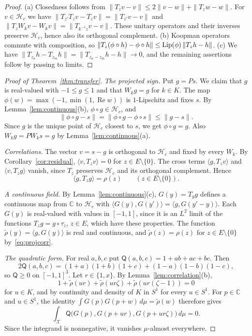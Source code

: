 \documentclass[10pt]{article}
\theoremstyle{remark}
\newcommand{\C}{\mathbb C}
\newcommand{\calH}{\mathcal H}
\DeclareMathOperator{\re}{Re}
\begin{document}
\begin{proof}
(a) Closedness follows from $\|T_zv-v\|\le2\|v-w\|+\|T_zw-w\|$. For $v\in\calH_c$ we have $\|T_{z'}T_zv-T_zv\|=\|T_{z'}v-v\|$ and $\|T_zW_kv-W_kv\|=\|T_{k^{-1}z}v-v\|$. These unitary operators and their inverses preserve $\calH_c$, hence also its orthogonal complement. (b) Koopman operators commute with composition, so $\|T_z(\phi\circ h)-\phi\circ h\|\le{\rm Lip}(\phi)\,\|T_zh-h\|$. (c) We have $\|T_{z_n}h-T_{z_m}h\|=\|T_{z_n-z_m}h-h\|\to0$, and the remaining assertions follow by passing to limits.
\end{proof}

\begin{proof}[Proof of Theorem~\ref{thm:transfer}]
\emph{The projected sign.} Put $g=Ps$. We claim that $g$ is real-valued with $-1\le g\le1$ and that $W_kg=g$ for $k\in K$. The map $\phi(w)=\max(-1,\min(1,\re w))$ is $1$-Lipschitz and fixes $s$. By Lemma~\ref{lem:continuous}(b), $\phi\circ g\in\calH_c$, and
\[
 \|\phi\circ g-s\|=\|\phi\circ g-\phi\circ s\|\le\|g-s\|.
\]
Since $g$ is the unique point of $\calH_c$ closest to $s$, we get $\phi\circ g=g$. Also $W_kg=PW_ks=g$ by Lemma~\ref{lem:continuous}(a).

\emph{Correlations.} The vector $v=s-g$ is orthogonal to $\calH_c$ and fixed by every $W_k$. By Corollary~\ref{cor:residual}, $\langle v,T_zv\rangle=0$ for $z\in E\setminus\{0\}$. The cross terms $\langle g,T_zv\rangle$ and $\langle v,T_zg\rangle$ vanish, since $T_z$ preserves $\calH_c$ and its orthogonal complement. Hence
\begin{equation}\label{eq:projcorr}
 \langle g,T_zg\rangle=\rho(z)\qquad(z\in E\setminus\{0\}).
\end{equation}

\emph{A continuous field.} By Lemma~\ref{lem:continuous}(c), $G(y)=T_yg$ defines a continuous map from $\C$ to $\calH_c$ with $\langle G(y),G(y')\rangle=\langle g,G(y'-y)\rangle$. Each $G(y)$ is real-valued with values in $[-1,1]$, since it is an $L^2$ limit of the functions $T_zg=g\circ\tau_z$, $z\in E$, which have these properties. The function $\tilde\rho(y)=\langle g,G(y)\rangle$ is real and continuous, and $\tilde\rho(z)=\rho(z)$ for $z\in E\setminus\{0\}$ by~\eqref{eq:projcorr}.

\emph{The quadratic form.} For real $a,b,c$ put $\mathsf Q(a,b,c)=1+ab+ac+bc$. Then
\[
 2\mathsf Q(a,b,c)=(1+a)(1+b)(1+c)+(1-a)(1-b)(1-c),
\]
so $\mathsf Q\ge0$ on $[-1,1]^3$. Let $r\in\{1,x\}$. By Lemma~\ref{lem:correlation}(b),
\[
 1+\tilde\rho(ur)+\tilde\rho(ur\zeta)+\tilde\rho(ur(\zeta-1))=0
\]
for $u\in K$, and by continuity and density of $K$ in $S^1$ for every $u\in S^1$. For $p\in\C$ and $u\in S^1$, the identity $\int G(p)G(p+w)\,d\mu=\tilde\rho(w)$ therefore gives
\[
 \int_{\mathcal X}\mathsf Q\bigl(G(p),G(p+ur),G(p+ur\zeta)\bigr)\,d\mu=0.
\]
Since the integrand is nonnegative, it vanishes $\mu$-almost everywhere.


\end{proof}
\end{document}
